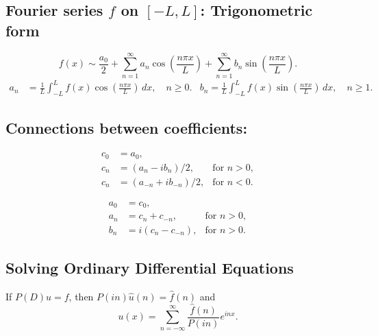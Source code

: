 \subsection*{Fourier series $f$ on $[-L,L]$: Trigonometric form}

   \[
  f(x) \sim \frac{a_0}2 + \sum_{n=1}^\infty a_n \cos\left(\frac {n\pi x}L \right) + 
  \sum_{n=1}^{\infty}b_n \sin\left(\frac{n\pi x}L \right).
 \]
  \begin{align*}
   a_n &= \frac 1L \int_{-L}^{L} f(x) \cos\left(\frac{n\pi x}L\right)\, dx, \quad n\geq 0.
  &b_n = \frac 1L \int_{-L}^L f(x) \sin\left(\frac{n\pi x}L \right)\, dx, \quad n\geq 1.
 \end{align*}

 \subsection*{Connections between coefficients:}
 \begin{minipage}{.45\linewidth}
    \begin{align*}
    c_0 &= a_0,\\
    c_n &= (a_n-ib_n)/2, &\text{for } n>0,\\
    c_n &= (a_{-n} + ib_{-n})/2, &\text{for } n<0.
    \end{align*}
  \end{minipage}%
  \begin{minipage}{.45\linewidth}
    \begin{align*}
    a_0 &= c_0,\\
    a_n &= c_n + c_{-n}, &\text{for } n>0,\\
    b_n &= i(c_n - c_{-n}), &\text{for } n>0.
    \end{align*}
  \end{minipage}%

 \subsection*{Solving Ordinary Differential Equations}
  If $P(D)u=f$, then $P(in)\hat u(n) = \hat f(n)$ and
\[ u(x) = \sum_{n=-\infty}^{\infty} \frac{\hat f(n)}{P(in)}e^{inx}.\]
 
